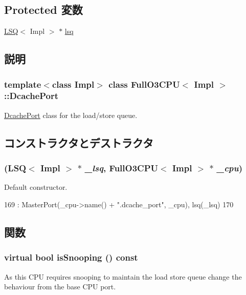 \subsection*{Protected 変数}
\begin{DoxyCompactItemize}
\item 
\hyperlink{classLSQ}{LSQ}$<$ Impl $>$ $\ast$ \hyperlink{classFullO3CPU_1_1DcachePort_a031bbb555122076457987d89d34e8711}{lsq}
\end{DoxyCompactItemize}


\subsection{説明}
\subsubsection*{template$<$class Impl$>$ class FullO3CPU$<$ Impl $>$::DcachePort}

\hyperlink{classFullO3CPU_1_1DcachePort}{DcachePort} class for the load/store queue. 

\subsection{コンストラクタとデストラクタ}
\hypertarget{classFullO3CPU_1_1DcachePort_a6129287aaec4d06e65661b6225e93a35}{
\subsubsection[{DcachePort}]{ ({\bf LSQ}$<$ Impl $>$ $\ast$ {\em \_\-lsq}, \/  {\bf FullO3CPU}$<$ Impl $>$ $\ast$ {\em \_\-cpu})}}
\label{classFullO3CPU_1_1DcachePort_a6129287aaec4d06e65661b6225e93a35}
Default constructor. 


\begin{DoxyCode}
169             : MasterPort(_cpu->name() + ".dcache_port", _cpu), lsq(_lsq)
170         { }
\end{DoxyCode}


\subsection{関数}
\hypertarget{classFullO3CPU_1_1DcachePort_a32602a6a3c3d66a639455036d6c08dd6}{
\subsubsection[{isSnooping}]{\setlength{\rightskip}{0pt plus 5cm}virtual bool isSnooping () const}}
\label{classFullO3CPU_1_1DcachePort_a32602a6a3c3d66a639455036d6c08dd6}
As this CPU requires snooping to maintain the load store queue change the behaviour from the base CPU port.

